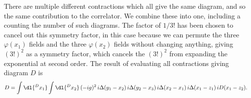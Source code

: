 \documentclass[fleqn]{NotesClass}
\begin{document}
    There are multiple different contractions which all give the same diagram, and so the same contribution to the correlator.
    We combine these into one, including a  counting the number of such diagrams.
    The factor of \(1/3!\) has been chosen to cancel out this symmetry factor, in this case because we can permute the three \(\varphi(x_1)\) fields and the three \(\varphi(x_2)\) fields without changing anything, giving \((3!)^2\) as a symmetry factor, which cancels the \((3!)^2\) from expanding the exponential at second order.
    The result of evaluating all contractions giving diagram \(D\) is
    \begin{equation*}
        D = \int \dl{^Dx_1} \int \dl{^Dx_2} \, (-ig)^2 \, i\Delta(y_1 - x_2) \, i\Delta(y_2 - x_3) \, i\Delta(x_2 - x_1) \, i\Delta(x_1 - z_1) \, iD(x_1 - z_2).
    \end{equation*}
    
\end{document}
